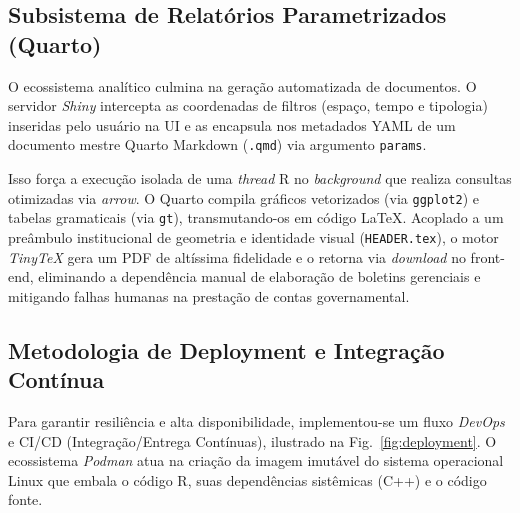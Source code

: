 \documentclass[10pt,conference]{IEEEtran}
\begin{document}
\subsection{Subsistema de Relatórios Parametrizados (Quarto)}

O ecossistema analítico culmina na geração automatizada de documentos. O servidor \textit{Shiny} intercepta as coordenadas de filtros (espaço, tempo e tipologia) inseridas pelo usuário na UI e as encapsula nos metadados YAML de um documento mestre Quarto Markdown (\texttt{.qmd}) via argumento \texttt{params}. 

Isso força a execução isolada de uma \textit{thread} R no \textit{background} que realiza consultas otimizadas via \textit{arrow}. O Quarto compila gráficos vetorizados (via \texttt{ggplot2}) e tabelas gramaticais (via \texttt{gt}), transmutando-os em código \LaTeX{}. Acoplado a um preâmbulo institucional de geometria e identidade visual (\texttt{HEADER.tex}), o motor \textit{TinyTeX} gera um PDF de altíssima fidelidade e o retorna via \textit{download} no front-end, eliminando a dependência manual de elaboração de boletins gerenciais e mitigando falhas humanas na prestação de contas governamental.

\subsection{Metodologia de Deployment e Integração Contínua}

Para garantir resiliência e alta disponibilidade, implementou-se um fluxo \textit{DevOps} e CI/CD (Integração/Entrega Contínuas), ilustrado na Fig.~\ref{fig:deployment}. O ecossistema \textit{Podman} \cite{podman2026} atua na criação da imagem imutável do sistema operacional Linux que embala o código R, suas dependências sistêmicas (C++) e o código fonte. 
\end{document}
